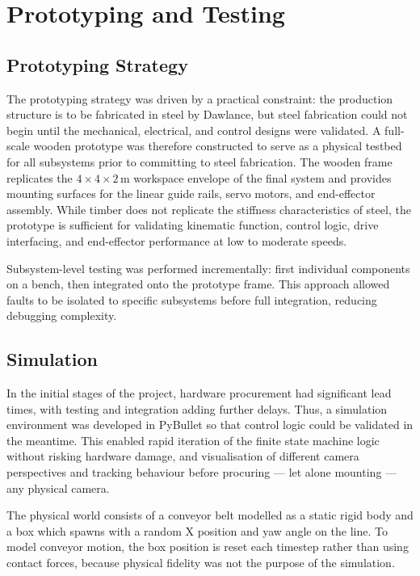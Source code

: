\chapter{Prototyping and Testing} \label{ch:prototyping}

\section{Prototyping Strategy}

The prototyping strategy was driven by a practical constraint: the production structure is to be fabricated in steel by Dawlance, but steel fabrication could not begin until the mechanical, electrical, and control designs were validated. A full-scale wooden prototype was therefore constructed to serve as a physical testbed for all subsystems prior to committing to steel fabrication. The wooden frame replicates the $4 \times 4 \times 2$\,m workspace envelope of the final system and provides mounting surfaces for the linear guide rails, servo motors, and end-effector assembly. While timber does not replicate the stiffness characteristics of steel, the prototype is sufficient for validating kinematic function, control logic, drive interfacing, and end-effector performance at low to moderate speeds.

Subsystem-level testing was performed incrementally: first individual components on a bench, then integrated onto the prototype frame. This approach allowed faults to be isolated to specific subsystems before full integration, reducing debugging complexity.

\section{Simulation}

In the initial stages of the project, hardware procurement had significant lead times, with testing and integration adding further delays. Thus, a simulation environment was developed in PyBullet so that control logic could be validated in the meantime. This enabled rapid iteration of the finite state machine logic without risking hardware damage, and visualisation of different camera perspectives and tracking behaviour before procuring --- let alone mounting --- any physical camera.

The physical world consists of a conveyor belt modelled as a static rigid body and a box which spawns with a random X position and yaw angle on the line. To model conveyor motion, the box position is reset each timestep rather than using contact forces, because physical fidelity was not the purpose of the simulation.

